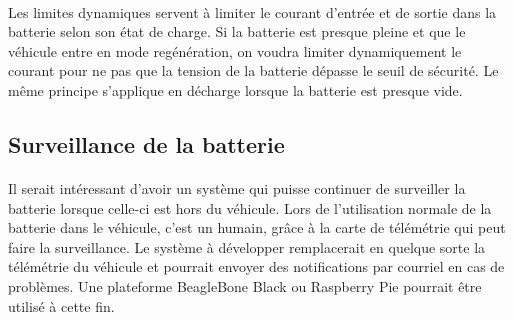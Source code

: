 		\paragraph{}
		Les limites dynamiques servent à limiter le courant d'entrée et de sortie dans la batterie selon son état de charge. Si la batterie est presque pleine et que le véhicule entre en mode regénération, on voudra limiter dynamiquement le courant pour ne pas que la tension de la batterie dépasse le seuil de sécurité. Le même principe s'applique en décharge lorsque la batterie est presque vide. 

	\subsection{Surveillance de la batterie}

		\paragraph{}
		Il serait intéressant d'avoir un système qui puisse continuer de surveiller la batterie lorsque celle-ci est hors du véhicule. Lors de l'utilisation normale de la batterie dans le véhicule, c'est un humain, grâce à la carte de télémétrie qui peut faire la surveillance. Le système à développer remplacerait en quelque sorte la télémétrie du véhicule et pourrait envoyer des notifications par courriel en cas de problèmes. Une plateforme BeagleBone Black ou Raspberry Pie pourrait être utilisé à cette fin.



